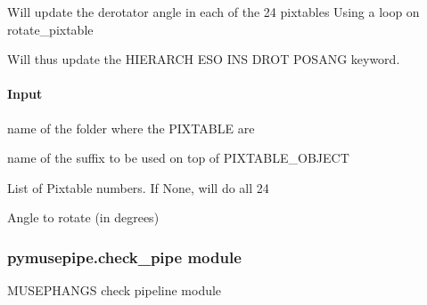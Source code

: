\documentclass[letterpaper,10pt,english]{sphinxmanual}
\begin{document}
\begin{fulllineitems}
\label{\detokenize{api/pymusepipe:pymusepipe.align_pipe.rotate_pixtables}}
\pysigstartsignatures
{}
\pysigstopsignatures
\sphinxAtStartPar
Will update the derotator angle in each of the 24 pixtables
Using a loop on rotate\_pixtable

\sphinxAtStartPar
Will thus update the HIERARCH ESO INS DROT POSANG keyword.


\paragraph{Input}
\label{\detokenize{api/pymusepipe:id38}}\begin{description}
\sphinxAtStartPar
name of the folder where the PIXTABLE are

\sphinxAtStartPar
name of the suffix to be used on top of PIXTABLE\_OBJECT

\sphinxAtStartPar
List of Pixtable numbers. If None, will do all 24

\sphinxAtStartPar
Angle to rotate (in degrees)

\end{description}

\end{fulllineitems}



\subsubsection{pymusepipe.check\_pipe module}
\label{\detokenize{api/pymusepipe:module-pymusepipe.check_pipe}}\label{\detokenize{api/pymusepipe:pymusepipe-check-pipe-module}}
\sphinxAtStartPar
MUSE\sphinxhyphen{}PHANGS check pipeline module
\end{document}
